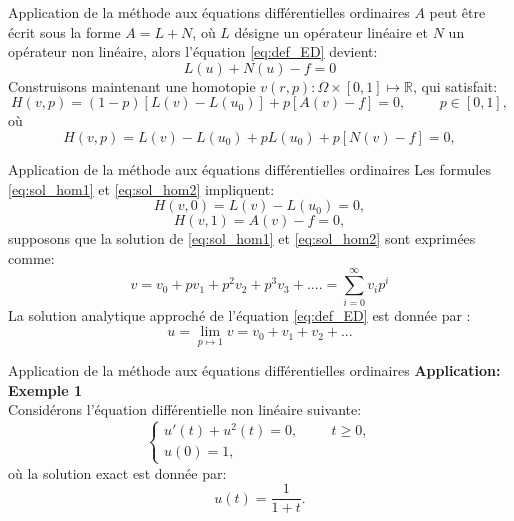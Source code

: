 \documentclass{sintefbeamer}
\begin{document}
\begin{frame}{Application de la méthode aux équations différentielles ordinaires}
     $A$ peut être écrit sous la forme $A=L+N$, où $L $ désigne un opérateur linéaire et $N$ un opérateur non linéaire, alors l'équation \ref{eq:def_ED} devient: 
\begin{equation}
    L(u) + N(u) - f =0
\end{equation}
Construisons maintenant une homotopie $v(r,p): \Omega \times[0,1] \mapsto \mathbb{R}$, qui satisfait:
\begin{equation}\label{eq:sol_hom1}
    H(v,p)=(1-p)[L(v)-L(u_0)]+p[A(v)-f]=0, \hspace{1cm} p\in [0,1],
\end{equation}
où
\begin{equation}\label{eq:sol_hom2}
    H(v,p) = L(v)-L(u_0) +pL(u_0)+p[N(v)-f]=0,
\end{equation}
\end{frame}


\begin{frame}{Application de la méthode aux équations différentielles ordinaires}
    Les formules \ref{eq:sol_hom1} et \ref{eq:sol_hom2} impliquent:
    \begin{equation}
        H(v,0)=L(v)-L(u_0)=0,
    \end{equation}
    \begin{equation}
        H(v,1)=A(v)-f=0,
    \end{equation}
    supposons que la solution de \ref{eq:sol_hom1} et \ref{eq:sol_hom2} sont exprimées comme:
    \begin{equation}
        v=v_0+pv_1+p^2v_2+p^3v_3+ .... = \sum_{i=0}^{\infty}v_ip^i
    \end{equation}
    La solution analytique approché de l'équation \ref{eq:def_ED} est donnée par :
    \begin{equation}
        u=\lim_{p\mapsto1}v = v_0 + v_1+v_2 +...
    \end{equation} 
\end{frame}



\begin{frame}{Application de la méthode aux équations différentielles ordinaires}
    \textbf{Application: Exemple 1} \\
    Considérons l'équation différentielle non linéaire suivante:
\begin{equation} \label{ex:EDO_1}
    \begin{cases}
        u'(t)+u^2(t)=0, \hspace{1cm} t\geq 0,\\
        u(0)=1,
    \end{cases}
\end{equation}
où la solution exact est donnée par:
\begin{equation}
    u(t)=\frac{1}{1+t}.
\end{equation}
\end{frame}
\end{document}
